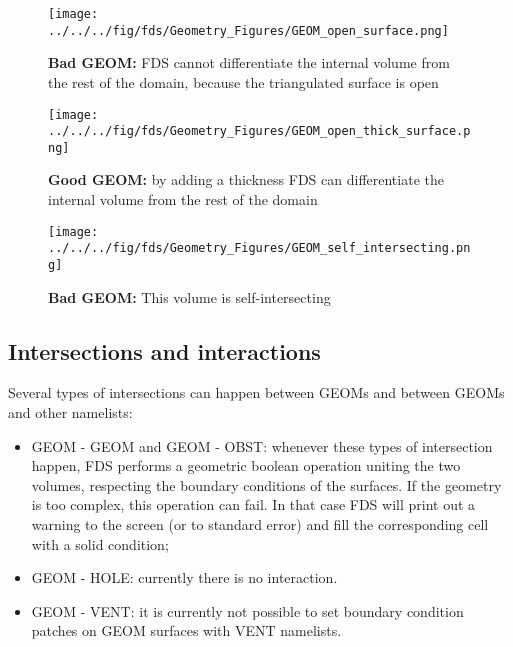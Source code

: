 \documentclass[12pt]{article}
\begin{document}
\begin{figure}
	\centering
	\begin{minipage}{.45\textwidth}
		\centering
		\texttt{[image: ../../../fig/fds/Geometry\_Figures/GEOM\_open\_surface.png]}
		\caption{\textbf{Bad {\ct GEOM}:} FDS cannot differentiate the internal volume from the rest of the domain, because the triangulated surface is open}
		\label{figure:GEOM_open_surface}
	\end{minipage}%
	\hfill
	\begin{minipage}{.45\textwidth}
		\centering
		\texttt{[image: ../../../fig/fds/Geometry\_Figures/GEOM\_open\_thick\_surface.png]}
		\caption{\textbf{Good {\ct GEOM}:} by adding a thickness FDS can differentiate the internal volume from the rest of the domain\newline}
		\label{figure:GEOM_open_thick_surface}
\end{minipage}%
\end{figure}

\begin{figure}
	\centering
	\texttt{[image: ../../../fig/fds/Geometry\_Figures/GEOM\_self\_intersecting.png]}
	\caption{\textbf{Bad {\ct GEOM}:} This volume is self-intersecting}
	\label{figure:GEOM_self_intersecting}
\end{figure}

\subsection{Intersections and interactions}

Several types of intersections can happen between {\ct GEOM}s and between {\ct GEOM}s and other namelists:

\begin{itemize}
	\item {\ct GEOM} - {\ct GEOM} and {\ct GEOM} - {\ct OBST}: whenever these types of intersection happen, FDS performs a geometric boolean operation uniting the two volumes, respecting the boundary conditions of the surfaces. If the geometry is too complex, this operation can fail. In that case FDS will print out a warning to the screen (or to standard error) and fill the corresponding cell with a solid condition;
	\item {\ct GEOM} - {\ct HOLE}: currently there is no interaction.
	\item {\ct GEOM} - {\ct VENT}: it is currently not possible to set boundary condition patches on {\ct GEOM} surfaces with {\ct VENT} namelists.
\end{itemize}
\end{document}
